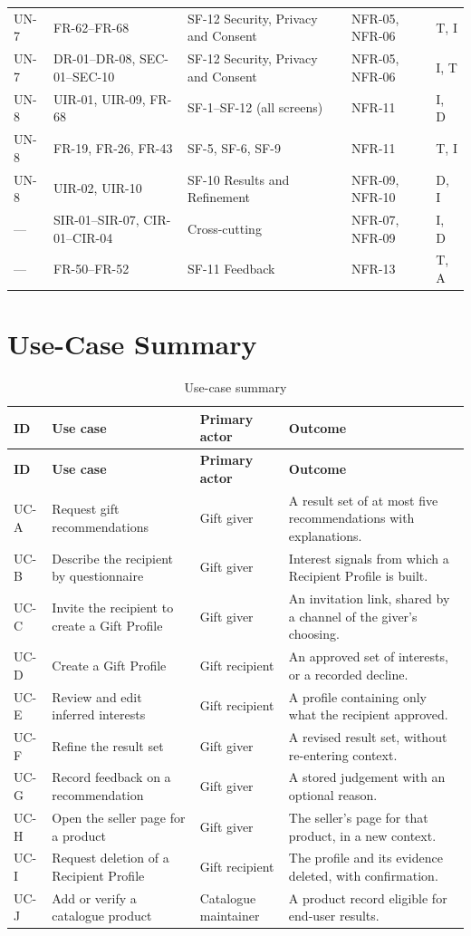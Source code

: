 \documentclass[11pt,a4paper]{report}
\begin{document}
\begin{longtable}{@{}L{1.4cm}L{4.1cm}L{4.1cm}L{3.0cm}L{1.5cm}@{}}
UN-7 & FR-62--FR-68 & SF-12 Security, Privacy and Consent & NFR-05, NFR-06 & T, I \\
UN-7 & DR-01--DR-08, SEC-01--SEC-10 & SF-12 Security, Privacy and Consent & NFR-05, NFR-06 & I, T \\
UN-8 & UIR-01, UIR-09, FR-68 & SF-1--SF-12 (all screens) & NFR-11 & I, D \\
UN-8 & FR-19, FR-26, FR-43 & SF-5, SF-6, SF-9 & NFR-11 & T, I \\
UN-8 & UIR-02, UIR-10 & SF-10 Results and Refinement & NFR-09, NFR-10 & D, I \\
--- & SIR-01--SIR-07, CIR-01--CIR-04 & Cross-cutting & NFR-07, NFR-09 & I, D \\
--- & FR-50--FR-52 & SF-11 Feedback & NFR-13 & T, A \\
\end{longtable}

\chapter{Use-Case Summary}
\label{app:usecases}
\begin{longtable}{@{}L{1.5cm}L{3.5cm}L{2.5cm}L{6.6cm}@{}}
\caption{Use-case summary}\\
\toprule
\textbf{ID} & \textbf{Use case} & \textbf{Primary actor} & \textbf{Outcome} \\ \midrule
\endfirsthead
\toprule \textbf{ID} & \textbf{Use case} & \textbf{Primary actor} & \textbf{Outcome} \\ \midrule
\endhead
\bottomrule
\endfoot
UC-A & Request gift recommendations & Gift giver & A result set of at most five recommendations with explanations. \\
UC-B & Describe the recipient by questionnaire & Gift giver & Interest signals from which a Recipient Profile is built. \\
UC-C & Invite the recipient to create a Gift Profile & Gift giver & An invitation link, shared by a channel of the giver's choosing. \\
UC-D & Create a Gift Profile & Gift recipient & An approved set of interests, or a recorded decline. \\
UC-E & Review and edit inferred interests & Gift recipient & A profile containing only what the recipient approved. \\
UC-F & Refine the result set & Gift giver & A revised result set, without re-entering context. \\
UC-G & Record feedback on a recommendation & Gift giver & A stored judgement with an optional reason. \\
UC-H & Open the seller page for a product & Gift giver & The seller's page for that product, in a new context. \\
UC-I & Request deletion of a Recipient Profile & Gift recipient & The profile and its evidence deleted, with confirmation. \\
UC-J & Add or verify a catalogue product & Catalogue maintainer & A product record eligible for end-user results. \\
\end{longtable}
\end{document}
